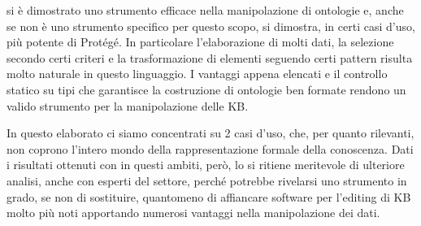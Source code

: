 \cduce si è dimostrato uno strumento efficace nella manipolazione di ontologie e, anche se non è uno strumento specifico per questo scopo, si dimostra, in certi casi d'uso, più potente di Protégé. In particolare l'elaborazione di molti dati, la selezione secondo certi criteri e la trasformazione di elementi seguendo certi pattern risulta molto naturale in questo linguaggio. I vantaggi appena elencati e il controllo statico su tipi che garantisce la costruzione di ontologie ben formate rendono \cduce un valido strumento per la manipolazione delle KB.

In questo elaborato ci siamo concentrati su 2 casi d'uso, che, per quanto rilevanti, non coprono l'intero mondo della rappresentazione formale della conoscenza. Dati i risultati ottenuti con \cduce in questi ambiti, però, lo si ritiene meritevole di ulteriore analisi, anche con esperti del settore, perché potrebbe rivelarsi uno strumento in grado, se non di sostituire, quantomeno di affiancare software per l'editing di KB molto più noti apportando numerosi vantaggi nella manipolazione dei dati.